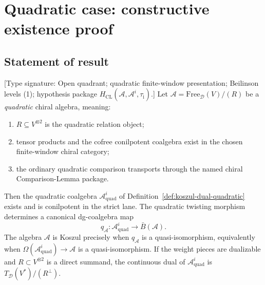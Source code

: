 \section{Quadratic case: constructive existence proof}
\label{sec:quadratic-existence}

\subsection{Statement of result}

\begin{theorem}\label{thm:quadratic-have-duals}
\textup{[Type signature: Open quadrant; quadratic finite-window
presentation; Beilinson levels (1); hypothesis
package
$H_{\mathrm{CL}}(\mathcal A,\mathcal A^i,\tau_{\mathrm i})$.]}
Let $\mathcal{A} = \text{Free}_{\mathcal{D}}(V) / (R)$ be a \emph{quadratic}
chiral algebra, meaning:
\begin{enumerate}
\item $R \subseteq V^{\otimes 2}$ is the quadratic relation object;
\item tensor products and the cofree conilpotent coalgebra exist in the
 chosen finite-window chiral category;
\item the ordinary quadratic comparison transports through the named
 chiral Comparison-Lemma package.
\end{enumerate}

Then the quadratic coalgebra $\mathcal{A}^i_{\mathrm{quad}}$ of
Definition~\ref{def:koszul-dual-quadratic} exists and is conilpotent
in the strict lane.  The quadratic twisting morphism determines a
canonical dg-coalgebra map
\[
q_{\mathcal A}\colon
\mathcal{A}^i_{\mathrm{quad}}\longrightarrow\bar B(\mathcal A).
\]
The algebra $\mathcal A$ is Koszul precisely when $q_{\mathcal A}$ is
a quasi-isomorphism, equivalently when
$\Omega(\mathcal A^i_{\mathrm{quad}})\to\mathcal A$ is a
quasi-isomorphism.  If the weight pieces are dualizable and
$R\subset V^{\otimes2}$ is a direct summand, the continuous dual of
$\mathcal A^i_{\mathrm{quad}}$ is
$T_{\mathcal D}(V^*)/(R^\perp)$.
\end{theorem}

